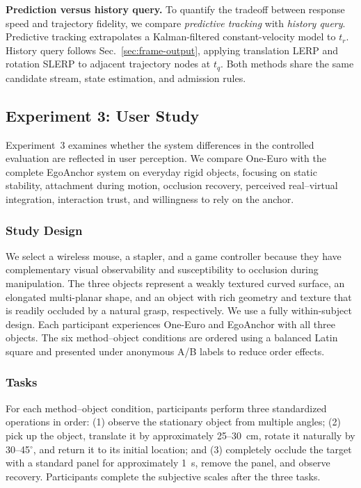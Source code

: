 \documentclass[review]{vgtc}
\begin{document}
\textbf{Prediction versus history query.}
To quantify the tradeoff between response speed and trajectory fidelity, we compare \emph{predictive tracking} with \emph{history query}. Predictive tracking extrapolates a Kalman-filtered constant-velocity model to $t_r$. History query follows Sec.~\ref{sec:frame-output}, applying translation LERP and rotation SLERP to adjacent trajectory nodes at $t_q$. Both methods share the same candidate stream, state estimation, and admission rules.

\subsection{Experiment 3: User Study}\label{sec:exp3-design}

Experiment~3 examines whether the system differences in the controlled evaluation are reflected in user perception. We compare One-Euro with the complete EgoAnchor system on everyday rigid objects, focusing on static stability, attachment during motion, occlusion recovery, perceived real--virtual integration, interaction trust, and willingness to rely on the anchor.

\subsubsection{Study Design}

We select a wireless mouse, a stapler, and a game controller because they have complementary visual observability and susceptibility to occlusion during manipulation. The three objects represent a weakly textured curved surface, an elongated multi-planar shape, and an object with rich geometry and texture that is readily occluded by a natural grasp, respectively. We use a fully within-subject design. Each participant experiences One-Euro and EgoAnchor with all three objects. The six method--object conditions are ordered using a balanced Latin square and presented under anonymous A/B labels to reduce order effects.

\subsubsection{Tasks}

For each method--object condition, participants perform three standardized operations in order: (1) observe the stationary object from multiple angles; (2) pick up the object, translate it by approximately 25--30~cm, rotate it naturally by 30--45$^\circ$, and return it to its initial location; and (3) completely occlude the target with a standard panel for approximately 1~s, remove the panel, and observe recovery. Participants complete the subjective scales after the three tasks.
\end{document}
